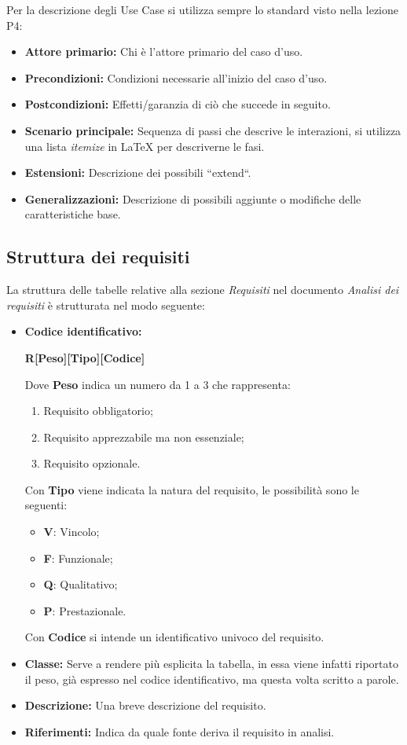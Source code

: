 \noindent Per la descrizione degli Use Case si utilizza sempre lo standard visto nella lezione P4:
\begin{itemize}
	\item \textbf{Attore primario:} Chi è l'attore primario del caso d'uso.
	\item \textbf{Precondizioni:} Condizioni necessarie all'inizio del caso d'uso.
	\item \textbf{Postcondizioni:} Effetti/garanzia di ciò che succede in seguito.
	\item \textbf{Scenario principale:} Sequenza di passi che descrive le interazioni, si utilizza una lista \textit{itemize} in LaTeX per descriverne le fasi.
	\item \textbf{Estensioni:} Descrizione dei possibili ``extend``.
	\item \textbf{Generalizzazioni:} Descrizione di possibili aggiunte o modifiche delle caratteristiche base.
\end{itemize}

\subsection{Struttura dei requisiti}
La struttura delle tabelle relative alla sezione \textit{Requisiti} nel documento \textit{Analisi dei requisiti} è strutturata nel modo seguente:
\begin{itemize}
    \item   \textbf{Codice identificativo:}
            \par \centerline{\textbf{R[Peso][Tipo][Codice]}}
            Dove \textbf{Peso} indica un numero da 1 a 3 che rappresenta:
            \begin{enumerate}
                \item Requisito obbligatorio;
                \item Requisito apprezzabile ma non essenziale;
                \item Requisito opzionale.
            \end{enumerate}
            Con \textbf{Tipo} viene indicata la natura del requisito, le possibilità sono le seguenti:
            \begin{itemize}
                \item \textbf{V}: Vincolo;
                \item \textbf{F}: Funzionale;
                \item \textbf{Q}: Qualitativo;
                \item \textbf{P}: Prestazionale.
            \end{itemize}
            Con \textbf{Codice} si intende un identificativo univoco del requisito.
    \item \textbf{Classe:} Serve a rendere più esplicita la tabella, in essa viene infatti riportato il peso, già espresso nel codice identificativo, ma questa volta scritto a parole.
    \item \textbf{Descrizione:} Una breve descrizione del requisito.
    \item \textbf{Riferimenti:} Indica da quale fonte deriva il requisito in analisi.   
\end{itemize}